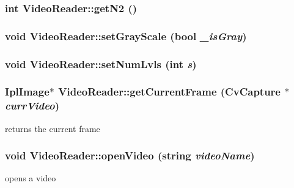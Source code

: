\subsubsection{\setlength{\rightskip}{0pt plus 5cm}int VideoReader::getN2 ()\hspace{0.3cm}{\tt  [inline]}}\label{classVideoReader_a05ae0af66423566ab965c337403d955}


\subsubsection{\setlength{\rightskip}{0pt plus 5cm}void VideoReader::setGrayScale (bool {\em \_\-isGray})\hspace{0.3cm}{\tt  [inline]}}\label{classVideoReader_797a9ecb59a69145c074b7414af3ef12}


\subsubsection{\setlength{\rightskip}{0pt plus 5cm}void VideoReader::setNumLvls (int {\em s})\hspace{0.3cm}{\tt  [inline]}}\label{classVideoReader_0882334d0d49bb404faf5eedf06ffa5c}


\subsubsection{\setlength{\rightskip}{0pt plus 5cm}IplImage$\ast$ VideoReader::getCurrentFrame (CvCapture $\ast$ {\em currVideo})}\label{classVideoReader_cd5d16555d3bfde02fc99653ca4419cd}


returns the current frame 

\subsubsection{\setlength{\rightskip}{0pt plus 5cm}void VideoReader::openVideo (string {\em videoName})}\label{classVideoReader_adc3521b176c93d1530f46c3a1f1cf3a}


opens a video 

